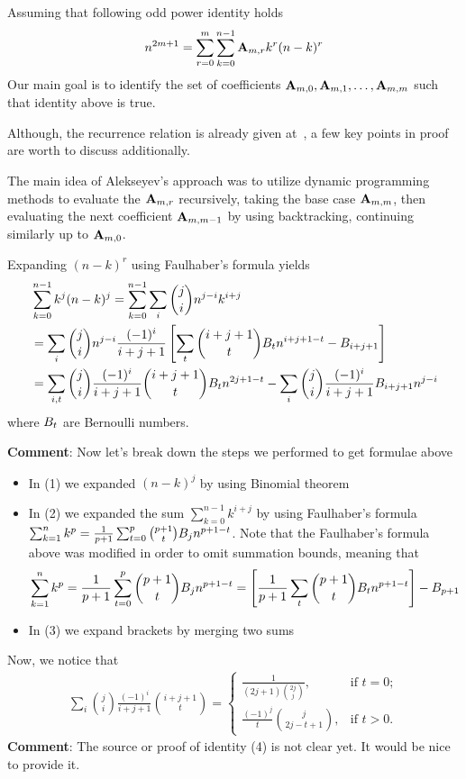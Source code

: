 Assuming that following odd power identity holds
\begin{align*}
    n^{2m+1} = \sum_{r=0}^{m} \sum_{k=0}^{n-1} {\mathbf{A}} \sb{m,r} k^r (n-k)^r
\end{align*}
Our main goal is to identify the set of coefficients ${\mathbf{A}} \sb{m,0}, {\mathbf{A}} \sb{m,1}, \ldots, {\mathbf{A}} \sb{m,m}$
such that identity above is true.

Although, the recurrence relation is already given at~\cite{alekseyev2018mathoverflow}, a few key points in proof
are worth to discuss additionally.

The main idea of Alekseyev's approach was to utilize dynamic programming methods to evaluate the ${\mathbf{A}} \sb{m,r}$ recursively,
taking the base case ${\mathbf{A}} \sb{m,m}$, then evaluating the next coefficient ${\mathbf{A}} \sb{m,m-1}$
by using backtracking, continuing similarly up to ${\mathbf{A}} \sb{m,0}$.

Expanding $(n-k)^r$ using Faulhaber's formula yields
\begin{align}
    &\sum_{k=0}^{n-1} k^{j} (n-k)^{j} = \sum_{k=0}^{n-1} \sum_{i} \binom{j}{i} n^{j-i} k^{i+j} \\
    &= \sum_{i} \binom{j}{i} n^{j-i} \frac{(-1)^i}{i+j+1} \left[ \sum_{t} \binom{i+j+1}{t} {B}\sb{t} n^{i+j+1-t} - {B}\sb{i+j+1} \right] \\
    &=\sum_{i,t} \binom{j}{i} \frac{(-1)^i}{i+j+1} \binom{i+j+1}t B_t n^{2j+1-t} - \sum_{i} \binom{j}{i}  \frac{(-1)^i}{i+j+1} B_{i+j+1} n^{j-i}
\end{align}
where ${B}\sb{t}$ are Bernoulli numbers.

\textbf{Comment}: Now let's break down the steps we performed to get formulae above
\begin{itemize}
    \item In (1) we expanded $(n-k)^{j}$ by using Binomial theorem
    \item In (2) we expanded the sum $\sum_{k=0}^{n-1} k^{i+j}$ by using Faulhaber's formula
    $\sum_{k=1}^{n} k^{p} = \frac{1}{p+1}\sum_{t=0}^{p} \binom{p+1}{t} {B}\sb{j} n^{p+1-t}$.
    Note that the Faulhaber's formula above was modified in order to omit summation bounds, meaning that
    \begin{align*}
        \sum_{k=1}^{n} k^{p} = \frac{1}{p+1}\sum_{t=0}^{p} \binom{p+1}{t} {B}\sb{j} n^{p+1-t}
        = \left[ \frac{1}{p+1}\sum_{t} \binom{p+1}{t} {B}\sb{t} n^{p+1-t} \right] - {B}\sb{p+1}
    \end{align*}
    \item In (3) we expand brackets by merging two sums
\end{itemize}
Now, we notice that
\begin{align}
    \sum_{i} \binom{j}{i} \frac{(-1)^i}{i+j+1} \binom{i+j+1}t
    =\begin{cases}
         \frac{1}{(2j+1)\binom{2j}j}, & \text{if } t=0;\\
         \frac{(-1)^j}{t}\binom{j}{2j-t+1}, & \text{if } t>0.
    \end{cases}
\end{align}
\textbf{Comment}: The source or proof of identity (4) is not clear yet.
It would be nice to provide it.

